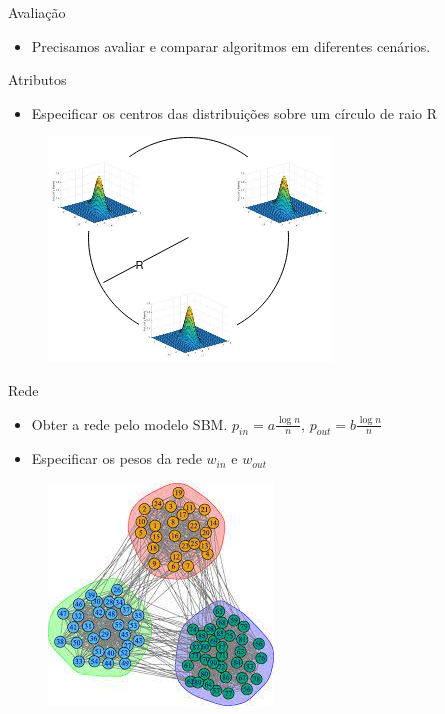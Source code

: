 \documentclass[aspectratio=169]{beamer}
\begin{document}
\begin{frame}{Avaliação}
\begin{itemize}
\item Precisamos avaliar e comparar algoritmos em diferentes cenários.
\end{itemize}

\begin{minipage}{0.45\textwidth}
Atributos
\begin{itemize}
    \item Especificar os centros das distribuições sobre um círculo de raio R
\end{itemize}
    \begin{figure}
        \centering\includegraphics[scale=0.4]{img/synthetic_net.png}
    \end{figure}
\end{minipage}
\hfill
\begin{minipage}{0.45\textwidth}
Rede
\begin{itemize}
    \item Obter a rede pelo modelo SBM. $p_{in} = a\frac{\log n}{n}$, $p_{out} = b\frac{\log n}{n}$
    \item Especificar os pesos da rede $w_{in}$ e $w_{out}$
\end{itemize}
\begin{figure}
    \centering
    \includegraphics[scale=0.3]{img/SBM_.jpeg}
\end{figure}
\end{minipage}
\end{frame}
\end{document}
